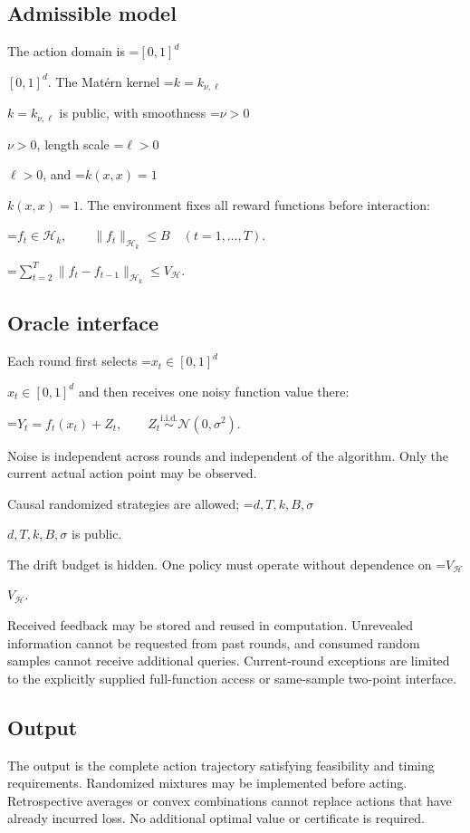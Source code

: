 \documentclass[10pt,a4paper]{article}
\newcommand{\AtlasMath}[1]{\par\begingroup\centering\setbox0=\hbox{$\displaystyle #1$}\ifdim\wd0>1.4\linewidth\typeout{ATLAS WIDE FORMULA: \the\wd0}\fi\ifdim\wd0>\linewidth\resizebox{\linewidth}{!}{\box0}\else\box0\fi\par\endgroup}
\newcommand{\AtlasInlineMath}[1]{\begingroup\setbox0=\hbox{$#1$}\ifdim\wd0>.4\linewidth\endgroup\AtlasMath{#1}\else\endgroup$#1$\fi}
\begin{document}
\subsection{Admissible model}
The action domain is \AtlasInlineMath{[0,1]^d}. The Matérn kernel \AtlasInlineMath{k=k_{\nu,\ell}} is public, with smoothness \AtlasInlineMath{\nu>0}, length scale \AtlasInlineMath{\ell>0}, and \AtlasInlineMath{k(x,x)=1}. The environment fixes all reward functions before interaction:


\AtlasMath{f_t\in\mathcal{H}_k,\qquad \|f_t\|_{\mathcal{H}_k}\le B\quad(t=1,\ldots,T).}



\AtlasMath{\sum_{t=2}^{T}\|f_t-f_{t-1}\|_{\mathcal{H}_k}\le V_{\mathcal{H}}.}


\subsection{Oracle interface}
Each round first selects \AtlasInlineMath{x_t\in[0,1]^d} and then receives one noisy function value there:


\AtlasMath{Y_t=f_t(x_t)+Z_t,\qquad Z_t\overset{\mathrm{i.i.d.}}\sim\mathcal{N}(0,\sigma^2).}


Noise is independent across rounds and independent of the algorithm. Only the current actual action point may be observed.

Causal randomized strategies are allowed; \AtlasInlineMath{d,T,k,B,\sigma} is public.

The drift budget is hidden. One policy must operate without dependence on \AtlasInlineMath{V_{\mathcal{H}}}.

Received feedback may be stored and reused in computation. Unrevealed information cannot be requested from past rounds, and consumed random samples cannot receive additional queries. Current-round exceptions are limited to the explicitly supplied full-function access or same-sample two-point interface.

\subsection{Output}
The output is the complete action trajectory satisfying feasibility and timing requirements. Randomized mixtures may be implemented before acting. Retrospective averages or convex combinations cannot replace actions that have already incurred loss. No additional optimal value or certificate is required.
\end{document}
